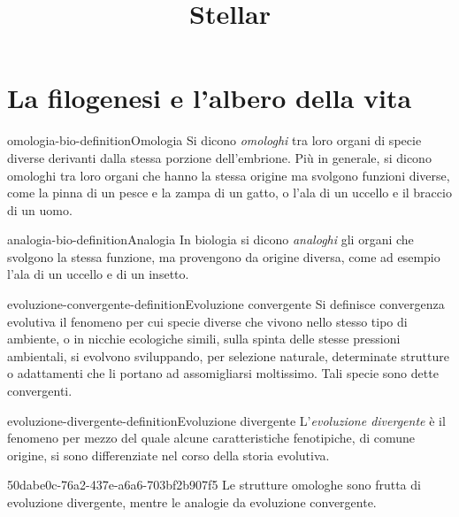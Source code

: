 \documentclass[preview]{standalone}
\begin{document}
\title{Stellar}
\genpage

\section{La filogenesi e l'albero della vita}


\begin{snippetdefinition}{omologia-bio-definition}{Omologia}
    Si dicono \textit{omologhi} tra loro organi di specie diverse derivanti dalla stessa porzione dell'embrione.
    Più in generale, si dicono omologhi tra loro organi che hanno la stessa origine ma svolgono funzioni diverse, come la pinna di un pesce e la zampa di un gatto, o l'ala di un uccello e il braccio di un uomo.
\end{snippetdefinition}

\begin{snippetdefinition}{analogia-bio-definition}{Analogia}
    In biologia si dicono \textit{analoghi} gli organi che svolgono la stessa funzione, ma provengono da origine diversa, come ad esempio l'ala di un uccello e di un insetto.
\end{snippetdefinition}

\begin{snippetdefinition}{evoluzione-convergente-definition}{Evoluzione convergente}
    Si definisce convergenza evolutiva il fenomeno per cui specie diverse che vivono nello stesso tipo di ambiente, o in nicchie ecologiche simili, sulla spinta delle stesse pressioni ambientali, si evolvono sviluppando, per selezione naturale, determinate strutture o adattamenti che li portano ad assomigliarsi moltissimo. Tali specie sono dette convergenti. 
\end{snippetdefinition}

\begin{snippetdefinition}{evoluzione-divergente-definition}{Evoluzione divergente}
    L'\textit{evoluzione divergente} è il fenomeno per mezzo del quale alcune caratteristiche fenotipiche, di comune origine, si sono differenziate nel corso della storia evolutiva. 
\end{snippetdefinition}

\begin{snippet}{50dabe0c-76a2-437e-a6a6-703bf2b907f5}
    Le strutture omologhe sono frutta di evoluzione divergente, mentre le analogie da
    evoluzione convergente.
\end{snippet}
\end{document}
